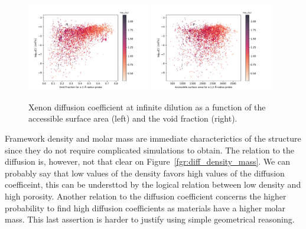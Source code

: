 \documentclass[main]{subfiles}
\begin{document}
\begin{figure}[ht]
  \centering
    \includegraphics[width=0.48\textwidth]{figures/5-diffusion/D_log-vf_2_s_+.pdf}
    \includegraphics[width=0.48\textwidth]{figures/5-diffusion/D_log-sa_12_s_+.pdf}
    \caption{Xenon diffusion coefficient at infinite dilution as a function of the accessible surface area (left) and the void fraction (right). }\label{fgr:diff_sa_vf}
\end{figure}

Framework density and molar mass are immediate characterictics of the structure since they do not require complicated simulations to obtain. The relation to the diffusion is, however, not that clear on Figure~\ref{fgr:diff_density_mass}. We can probably say that low values of the density favors high values of the diffusion coefficeint, this can be understtod by the logical relation between low density and high porosity. Another relation to the diffusion coefficient concerns the higher probability to find high diffusion coefficients as materials have a higher molar mass. This last assertion is harder to justify using simple geometrical reasoning. 
\end{document}
